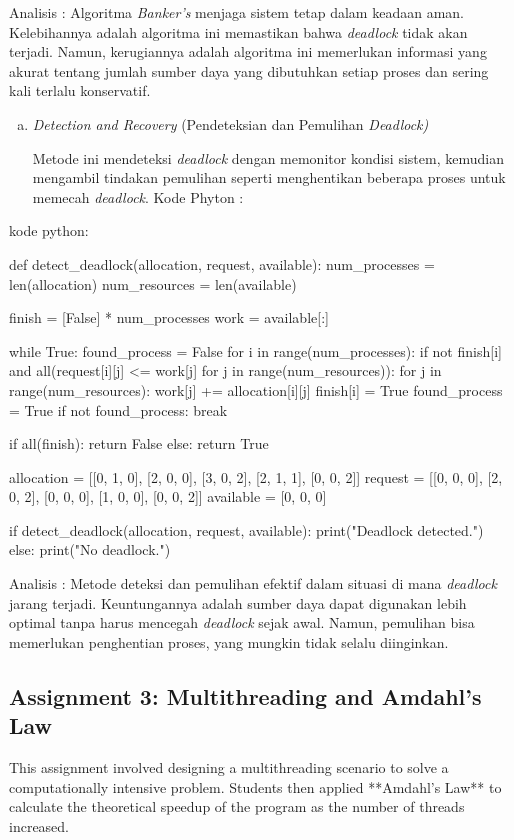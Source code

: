 \documentclass[12pt]{article}
\begin{document}
Analisis : Algoritma \textit{Banker's} menjaga sistem tetap dalam keadaan aman. Kelebihannya adalah algoritma ini memastikan bahwa \textit{deadlock} tidak akan terjadi. Namun, kerugiannya adalah algoritma ini memerlukan informasi yang akurat tentang jumlah sumber daya yang dibutuhkan setiap proses dan sering kali terlalu konservatif.


\begin{enumerate}[d.]
    \item \textit{Detection and Recovery} (Pendeteksian dan Pemulihan \textit{Deadlock)}

    Metode ini mendeteksi \textit{deadlock} dengan memonitor kondisi sistem, kemudian mengambil tindakan pemulihan seperti menghentikan beberapa proses untuk memecah \textit{deadlock}.
Kode Phyton :
\end{enumerate}

kode python:

\begin{python}
def detect_deadlock(allocation, request, available):
    num_processes = len(allocation)
    num_resources = len(available)

    finish = [False] * num_processes
    work = available[:]

    while True:
        found_process = False
        for i in range(num_processes):
            if not finish[i] and all(request[i][j] <= work[j] for j in range(num_resources)):
                for j in range(num_resources):
                    work[j] += allocation[i][j]
                finish[i] = True
                found_process = True
        if not found_process:
            break

    if all(finish):
        return False
    else:
        return True

allocation = [[0, 1, 0], [2, 0, 0], [3, 0, 2], [2, 1, 1], [0, 0, 2]]
request = [[0, 0, 0], [2, 0, 2], [0, 0, 0], [1, 0, 0], [0, 0, 2]]
available = [0, 0, 0]

if detect_deadlock(allocation, request, available):
    print("Deadlock detected.")
else:
    print("No deadlock.")
\end{python}

Analisis : Metode deteksi dan pemulihan efektif dalam situasi di mana \textit{deadlock} jarang terjadi. Keuntungannya adalah sumber daya dapat digunakan lebih optimal tanpa harus mencegah \textit{deadlock} sejak awal. Namun, pemulihan bisa memerlukan penghentian proses, yang mungkin tidak selalu diinginkan.


\subsection{Assignment 3: Multithreading and Amdahl's Law}
This assignment involved designing a multithreading scenario to solve a computationally intensive problem. Students then applied **Amdahl's Law** to calculate the theoretical speedup of the program as the number of threads increased.
\end{document}
